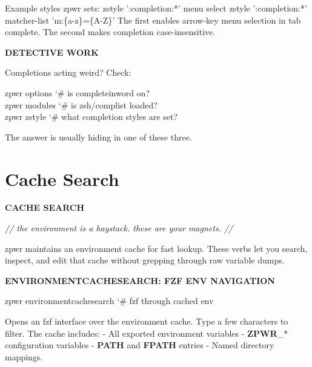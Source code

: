 \documentclass[11pt,a4paper,twoside]{book}
\begin{document}
Example styles zpwr sets: zstyle ':completion:*' menu select zstyle ':completion:*' matcher-list 'm:\{a-z\}=\{A-Z\}' The first enables arrow-key menu selection in tab complete. The second makes completion case-insensitive.


\vspace{12pt}
{\bfseries\color{neonyellow} DETECTIVE WORK}\vspace{4pt}

Completions acting weird? Check:

\begin{codebox}
\color{neongreen}zpwr options    {\char`\#} is completeinword on?\\
\color{neongreen}zpwr modules    {\char`\#} is zsh/complist loaded?\\
\color{neongreen}zpwr zstyle     {\char`\#} what completion styles are set?\\
\end{codebox}

The answer is usually hiding in one of these three.


\vspace{16pt}

\section{Cache Search}


\vspace{10pt}
{\large\bfseries\color{neoncyan} CACHE SEARCH}\vspace{6pt}

{\small\itshape\color{dimtext} // the environment is a haystack. these are your magnets. //}

zpwr maintains an environment cache for fast lookup. These verbs let you search, inspect, and edit that cache without grepping through raw variable dumps.


\vspace{12pt}
{\bfseries\color{neonyellow} ENVIRONMENTCACHESEARCH: FZF ENV NAVIGATION}\vspace{4pt}

\begin{codebox}
\color{neongreen}zpwr environmentcachesearch         {\char`\#} fzf through cached env\\
\end{codebox}

Opens an fzf interface over the environment cache. Type a few characters to filter. The cache includes: - All exported environment variables - \textbf{ZPWR}\_* configuration variables - \textbf{PATH} and \textbf{FPATH} entries - Named directory mappings.
\end{document}
